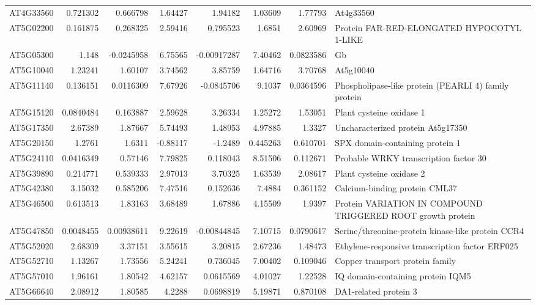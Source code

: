 \documentclass[11pt]{article}
\begin{document}
\begin{center}
\begin{tabular}{lrrrrrrl}
AT4G33560 & 0.721302 & 0.666798 & 1.64427 & 1.94182 & 1.03609 & 1.77793 & At4g33560\\
AT5G02200 & 0.161875 & 0.268325 & 2.59416 & 0.795523 & 1.6851 & 2.60969 & Protein FAR-RED-ELONGATED HYPOCOTYL 1-LIKE\\
AT5G05300 & 1.148 & -0.0245958 & 6.75565 & -0.00917287 & 7.40462 & 0.0823586 & Gb\\
AT5G10040 & 1.23241 & 1.60107 & 3.74562 & 3.85759 & 1.64716 & 3.70768 & At5g10040\\
AT5G11140 & 0.136151 & 0.0116309 & 7.67926 & -0.0845706 & 9.1037 & 0.0364596 & Phospholipase-like protein (PEARLI 4) family protein\\
AT5G15120 & 0.0840484 & 0.163887 & 2.59628 & 3.26334 & 1.25272 & 1.53051 & Plant cysteine oxidase 1\\
AT5G17350 & 2.67389 & 1.87667 & 5.74493 & 1.48953 & 4.97885 & 1.3327 & Uncharacterized protein At5g17350\\
AT5G20150 & 1.2761 & 1.6311 & -0.88117 & -1.2489 & 0.445263 & 0.610701 & SPX domain-containing protein 1\\
AT5G24110 & 0.0416349 & 0.57146 & 7.79825 & 0.118043 & 8.51506 & 0.112671 & Probable WRKY transcription factor 30\\
AT5G39890 & 0.214771 & 0.539333 & 2.97013 & 3.70325 & 1.63539 & 2.08617 & Plant cysteine oxidase 2\\
AT5G42380 & 3.15032 & 0.585206 & 7.47516 & 0.152636 & 7.4884 & 0.361152 & Calcium-binding protein CML37\\
AT5G46500 & 0.613513 & 1.83163 & 3.68489 & 1.67886 & 4.15509 & 1.9397 & Protein VARIATION IN COMPOUND TRIGGERED ROOT growth protein\\
AT5G47850 & 0.0048455 & 0.00938611 & 9.22619 & -0.00844845 & 7.10715 & 0.0790617 & Serine/threonine-protein kinase-like protein CCR4\\
AT5G52020 & 2.68309 & 3.37151 & 3.55615 & 3.20815 & 2.67236 & 1.48473 & Ethylene-responsive transcription factor ERF025\\
AT5G52710 & 1.13267 & 1.73556 & 5.24241 & 0.736045 & 7.00402 & 0.109046 & Copper transport protein family\\
AT5G57010 & 1.96161 & 1.80542 & 4.62157 & 0.0615569 & 4.01027 & 1.22528 & IQ domain-containing protein IQM5\\
AT5G66640 & 2.08912 & 1.80585 & 4.2288 & 0.0698819 & 5.19871 & 0.870108 & DA1-related protein 3\\
\end{tabular}
\end{center}
\end{document}
